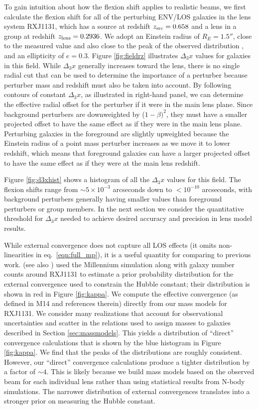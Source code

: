 \documentclass{emulateapj}
\begin{document}
To gain intuition about how the flexion shift applies to realistic beams, we first calculate the flexion shift for all of the perturbing ENV/LOS galaxies in the lens system RXJ1131, which has a source at redshift $z_{\rm{src}} = 0.658$ and a lens in a group at redshift $z_{\rm{lens}} = 0.2936$.  We adopt an Einstein radius of $R_E = 1.5''$, close to the measured value \citep{Suyu13} and also close to the peak of the observed distribution \citep{Sonnenfeld13}, and an ellipticity of $e=0.3$.  Figure \ref{fig:fieldrz} illustrates $\Delta_3 x$ values for galaxies in this field.  While $\Delta_3 x$ generally increases toward the lens, there is no single radial cut that can be used to determine the importance of a perturber because perturber mass and redshift must also be taken into account.  By following contours of constant $\Delta_3 x$, as illustrated in right-hand panel, we can determine the effective radial offset for the perturber if it were in the main lens plane. Since background perturbers are downweighted by ($1-\beta)^2$, they must have a smaller projected offset to have the same effect as if they were in the main lens plane. Perturbing galaxies in the foreground are slightly upweighted because the Einstein radius of a point mass perturber increases as we move it to lower redshift, which means that foreground galaxies can have a larger projected offset to have the same effect as if they were at the main lens redshift.

Figure \ref{fig:d3xhist} shows a histogram of all the $\Delta_3 x$ values for this field.  The flexion shifts range from $\sim 5 \times 10^{-3}$ arcseconds down to $<10^{-10}$ arcseconds, with background perturbers generally having smaller values than foreground perturbers or group members.  In the next section we consider the quantitative threshold for $\Delta_3 x$ needed to achieve desired accuracy and precision in lens model results.

While external convergence does not capture all LOS effects (it omits non-linearities in eq.\ \ref{eqn:full_mp}), it is a useful quantity for comparing to previous work. \citet{Suyu13} (see also \citealt{Rusu16}) used the Millennium simulation along with galaxy number counts around RXJ1131 to estimate a prior probability distribution for the external convergence used to constrain the Hubble constant; their distribution is shown in red in Figure \ref{fig:kappa}. We compute the effective convergence (as defined in M14 and references therein) directly from our mass models for RXJ1131.  We consider many realizations that account for observational uncertainties and scatter in the relations used to assign masses to galaxies described in Section \ref{sec:massmodels}.  This yields a distribution of ``direct'' convergence calculations that is shown by the blue histogram in Figure \ref{fig:kappa}. We find that the peaks of the distributions are roughly consistent. However, our ``direct'' convergence calculations produce a tighter distribution by a factor of $\sim 4$. This is likely because we build mass models based on the observed beam for each individual lens rather than using statistical results from N-body simulations. The narrower distribution of external convergences translates into a stronger prior on measuring the Hubble constant.
\end{document}
